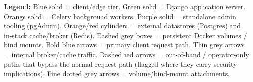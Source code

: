 \documentclass[10pt]{article}
\begin{document}
\vfill
\begin{center}
\begin{minipage}{0.94\textwidth}
\scriptsize
\textbf{Legend:} \textcolor{hkblue}{Blue solid} = client/edge tier. \textcolor{hkgreen}{Green solid} = Django application server.
\textcolor{hkorange}{Orange solid} = Celery background workers. \textcolor{hkpurple}{Purple solid} = standalone admin tooling
(pgAdmin). Orange/red cylinders = external datastores (Postgres) and in-stack cache/broker (Redis).
Dashed grey boxes = persistent Docker volumes / bind mounts. \textcolor{hkblue}{Bold blue arrows} = primary
client request path. Thin grey arrows = internal broker/cache traffic. \textcolor{hkred}{Dashed red arrows} =
out-of-band / operator-only paths that bypass the normal request path (flagged where they carry
security implications). Fine dotted grey arrows = volume/bind-mount attachments.
\end{minipage}
\end{center}
\end{document}
